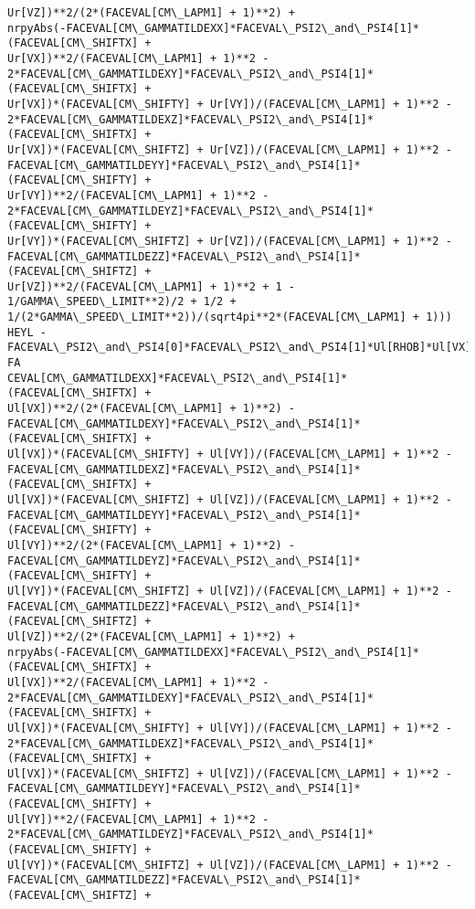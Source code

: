\documentclass[landscape,letterpaper,10pt,english]{article}
\begin{document}
\begin{Verbatim}[commandchars=\\\{\}]
Ur[VZ])**2/(2*(FACEVAL[CM\_LAPM1] + 1)**2) +
nrpyAbs(-FACEVAL[CM\_GAMMATILDEXX]*FACEVAL\_PSI2\_and\_PSI4[1]*(FACEVAL[CM\_SHIFTX] +
Ur[VX])**2/(FACEVAL[CM\_LAPM1] + 1)**2 -
2*FACEVAL[CM\_GAMMATILDEXY]*FACEVAL\_PSI2\_and\_PSI4[1]*(FACEVAL[CM\_SHIFTX] +
Ur[VX])*(FACEVAL[CM\_SHIFTY] + Ur[VY])/(FACEVAL[CM\_LAPM1] + 1)**2 -
2*FACEVAL[CM\_GAMMATILDEXZ]*FACEVAL\_PSI2\_and\_PSI4[1]*(FACEVAL[CM\_SHIFTX] +
Ur[VX])*(FACEVAL[CM\_SHIFTZ] + Ur[VZ])/(FACEVAL[CM\_LAPM1] + 1)**2 -
FACEVAL[CM\_GAMMATILDEYY]*FACEVAL\_PSI2\_and\_PSI4[1]*(FACEVAL[CM\_SHIFTY] +
Ur[VY])**2/(FACEVAL[CM\_LAPM1] + 1)**2 -
2*FACEVAL[CM\_GAMMATILDEYZ]*FACEVAL\_PSI2\_and\_PSI4[1]*(FACEVAL[CM\_SHIFTY] +
Ur[VY])*(FACEVAL[CM\_SHIFTZ] + Ur[VZ])/(FACEVAL[CM\_LAPM1] + 1)**2 -
FACEVAL[CM\_GAMMATILDEZZ]*FACEVAL\_PSI2\_and\_PSI4[1]*(FACEVAL[CM\_SHIFTZ] +
Ur[VZ])**2/(FACEVAL[CM\_LAPM1] + 1)**2 + 1 - 1/GAMMA\_SPEED\_LIMIT**2)/2 + 1/2 +
1/(2*GAMMA\_SPEED\_LIMIT**2))/(sqrt4pi**2*(FACEVAL[CM\_LAPM1] + 1)))
HEYL -FACEVAL\_PSI2\_and\_PSI4[0]*FACEVAL\_PSI2\_and\_PSI4[1]*Ul[RHOB]*Ul[VX]/sqrt(-FA
CEVAL[CM\_GAMMATILDEXX]*FACEVAL\_PSI2\_and\_PSI4[1]*(FACEVAL[CM\_SHIFTX] +
Ul[VX])**2/(2*(FACEVAL[CM\_LAPM1] + 1)**2) -
FACEVAL[CM\_GAMMATILDEXY]*FACEVAL\_PSI2\_and\_PSI4[1]*(FACEVAL[CM\_SHIFTX] +
Ul[VX])*(FACEVAL[CM\_SHIFTY] + Ul[VY])/(FACEVAL[CM\_LAPM1] + 1)**2 -
FACEVAL[CM\_GAMMATILDEXZ]*FACEVAL\_PSI2\_and\_PSI4[1]*(FACEVAL[CM\_SHIFTX] +
Ul[VX])*(FACEVAL[CM\_SHIFTZ] + Ul[VZ])/(FACEVAL[CM\_LAPM1] + 1)**2 -
FACEVAL[CM\_GAMMATILDEYY]*FACEVAL\_PSI2\_and\_PSI4[1]*(FACEVAL[CM\_SHIFTY] +
Ul[VY])**2/(2*(FACEVAL[CM\_LAPM1] + 1)**2) -
FACEVAL[CM\_GAMMATILDEYZ]*FACEVAL\_PSI2\_and\_PSI4[1]*(FACEVAL[CM\_SHIFTY] +
Ul[VY])*(FACEVAL[CM\_SHIFTZ] + Ul[VZ])/(FACEVAL[CM\_LAPM1] + 1)**2 -
FACEVAL[CM\_GAMMATILDEZZ]*FACEVAL\_PSI2\_and\_PSI4[1]*(FACEVAL[CM\_SHIFTZ] +
Ul[VZ])**2/(2*(FACEVAL[CM\_LAPM1] + 1)**2) +
nrpyAbs(-FACEVAL[CM\_GAMMATILDEXX]*FACEVAL\_PSI2\_and\_PSI4[1]*(FACEVAL[CM\_SHIFTX] +
Ul[VX])**2/(FACEVAL[CM\_LAPM1] + 1)**2 -
2*FACEVAL[CM\_GAMMATILDEXY]*FACEVAL\_PSI2\_and\_PSI4[1]*(FACEVAL[CM\_SHIFTX] +
Ul[VX])*(FACEVAL[CM\_SHIFTY] + Ul[VY])/(FACEVAL[CM\_LAPM1] + 1)**2 -
2*FACEVAL[CM\_GAMMATILDEXZ]*FACEVAL\_PSI2\_and\_PSI4[1]*(FACEVAL[CM\_SHIFTX] +
Ul[VX])*(FACEVAL[CM\_SHIFTZ] + Ul[VZ])/(FACEVAL[CM\_LAPM1] + 1)**2 -
FACEVAL[CM\_GAMMATILDEYY]*FACEVAL\_PSI2\_and\_PSI4[1]*(FACEVAL[CM\_SHIFTY] +
Ul[VY])**2/(FACEVAL[CM\_LAPM1] + 1)**2 -
2*FACEVAL[CM\_GAMMATILDEYZ]*FACEVAL\_PSI2\_and\_PSI4[1]*(FACEVAL[CM\_SHIFTY] +
Ul[VY])*(FACEVAL[CM\_SHIFTZ] + Ul[VZ])/(FACEVAL[CM\_LAPM1] + 1)**2 -
FACEVAL[CM\_GAMMATILDEZZ]*FACEVAL\_PSI2\_and\_PSI4[1]*(FACEVAL[CM\_SHIFTZ] +

\end{Verbatim}
\end{document}
